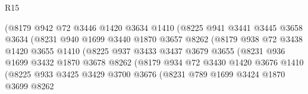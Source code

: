 \begin{lexlean}{R15}
\begin{coremodule}
                            (@8179
                              @942
                              @72
                              @3446
                              @1420
                              @3634
                              @1410
                              (@8225
                                @941
                                @3441
                                @3445
                                @3658
                                @3634
                                (@8231
                                  @940
                                  @1699
                                  @3440
                                  @1870
                                  @3657
                                  @8262
                                  (@8179
                                    @938
                                    @72
                                    @3438
                                    @1420
                                    @3655
                                    @1410
                                    (@8225
                                      @937
                                      @3433
                                      @3437
                                      @3679
                                      @3655
                                      (@8231
                                        @936
                                        @1699
                                        @3432
                                        @1870
                                        @3678
                                        @8262
                                        (@8179
                                          @934
                                          @72
                                          @3430
                                          @1420
                                          @3676
                                          @1410
                                          (@8225
                                            @933
                                            @3425
                                            @3429
                                            @3700
                                            @3676
                                            (@8231
                                              @789
                                              @1699
                                              @3424
                                              @1870
                                              @3699
                                              @8262

\end{coremodule}
\end{lexlean}
